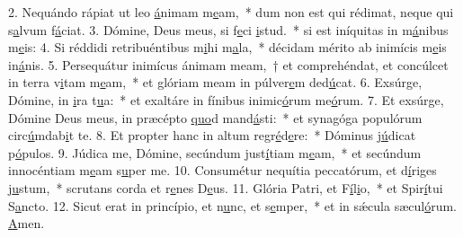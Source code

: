 2. Nequándo rápiat ut leo \uline{á}nimam m\uline{e}am,~* dum non est qui rédimat, neque qui s\uline{a}lvum f\uline{á}ciat.
3. Dómine, Deus meus, si f\uline{e}ci \uline{i}stud.~* si est iníquitas in m\uline{á}nibus m\uline{e}is:
4. Si réddidi retribuéntibus m\uline{i}hi m\uline{a}la,~* décidam mérito ab inimícis m\uline{e}is in\uline{á}nis.
5. Persequátur inimícus ánimam meam,~† et comprehéndat, et concúlcet in terra v\uline{i}tam m\uline{e}am,~* et glóriam meam in púlver\uline{e}m ded\uline{ú}cat.
6. Exsúrge, Dómine, in \uline{i}ra t\uline{u}a:~* et exaltáre in fínibus inimic\uline{ó}rum me\uline{ó}rum.
7. Et exsúrge, Dómine Deus meus, in præcépto \uline{quo}d mand\uline{á}sti:~* et synagóga populórum circ\uline{ú}mdab\uline{i}t te.
8. Et propter hanc in altum regr\uline{é}d\uline{e}re:~* Dóminus j\uline{ú}dicat p\uline{ó}pulos.
9. Júdica me, Dómine, secúndum just\uline{í}tiam m\uline{e}am,~* et secúndum innocéntiam m\uline{e}am s\uline{u}per me.
10. Consumétur nequítia peccatórum, et d\uline{í}riges j\uline{u}stum,~* scrutans corda et r\uline{e}nes D\uline{e}us.
11. Glória Patri, et F\uline{í}l\uline{i}o,~* et Spir\uline{í}tui S\uline{a}ncto.
12. Sicut erat in princípio, et n\uline{u}nc, et s\uline{e}mper,~* et in sǽcula sæcul\uline{ó}rum. \uline{A}men.
